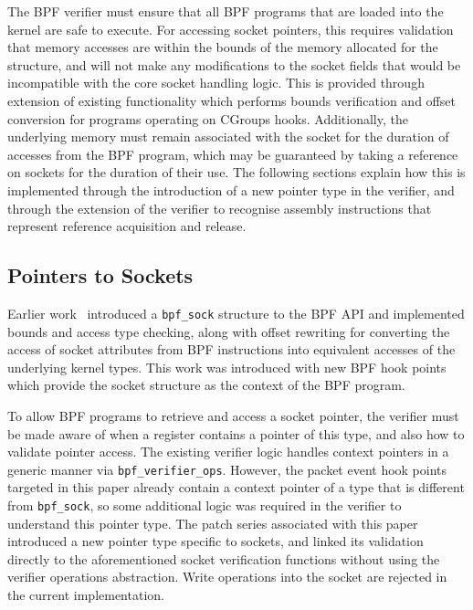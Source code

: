 \documentclass[10pt,sigconf,authorversion]{lpc}
\begin{document}

The BPF verifier must ensure that all BPF programs that are loaded into the
kernel are safe to execute. For accessing socket pointers, this requires
validation that memory accesses are within the bounds of the memory allocated
for the structure, and will not make any modifications to the socket fields
that would be incompatible with the core socket handling logic. This is
provided through extension of existing functionality which performs bounds
verification and offset conversion for programs operating on CGroups hooks.
Additionally, the underlying memory must remain associated with the socket for
the duration of accesses from the BPF program, which may be guaranteed by
taking a reference on sockets for the duration of their use. The following
sections explain how this is implemented through the introduction of a new
pointer type in the verifier, and through the extension of the verifier to
recognise assembly instructions that represent reference acquisition and
release.

\subsection{Pointers to Sockets}

Earlier work~\cite{bpf-sock} introduced a \verb+bpf_sock+ structure to the BPF
API and implemented bounds and access type checking, along with offset
rewriting for converting the access of socket attributes from BPF instructions
into equivalent accesses of the underlying kernel types. This work was
introduced with new BPF hook points which provide the socket structure as the
context of the BPF program.

To allow BPF programs to retrieve and access a socket pointer, the verifier
must be made aware of when a register contains a pointer of this type, and also
how to validate pointer access. The existing verifier logic handles context
pointers in a generic manner via \verb+bpf_verifier_ops+. However, the packet
event hook points targeted in this paper already contain a context pointer of a
type that is different from \verb+bpf_sock+, so some additional logic was
required in the verifier to understand this pointer type. The patch series
associated with this paper introduced a new pointer type specific to sockets,
and linked its validation directly to the aforementioned socket verification
functions without using the verifier operations abstraction. Write operations
into the socket are rejected in the current implementation.
\end{document}
